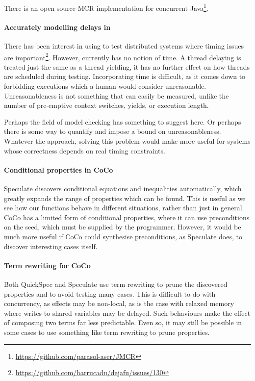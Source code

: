 There is an open source MCR implementation for concurrent
Java\footnote{\url{https://github.com/parasol-aser/JMCR}}.

\paragraph{Accurately modelling delays in \dejafu{}}
There has been interest in using \dejafu{} to test distributed systems
where timing issues are
important\footnote{\url{https://github.com/barrucadu/dejafu/issues/130}}.
However, \dejafu{} currently has no notion of time.  A thread delaying
is treated just the same as a thread yielding, it has no further
effect on how threads are scheduled during testing.  Incorporating
time is difficult, as it comes down to forbidding executions which a
human would consider unreasonable.  Unreasonableness is not something
that can easily be measured, unlike the number of pre-emptive context
switches, yields, or execution length.

Perhaps the field of model checking has something to suggest here.  Or
perhaps there is some way to quantify and impose a bound on
unreasonableness.  Whatever the approach, solving this problem would
make \dejafu{} more useful for systems whose correctness depends on
real timing constraints.

\paragraph{Conditional properties in CoCo}
Speculate\cite{braquehais2017} discovers conditional equations and
inequalities automatically, which greatly expands the range of
properties which can be found.  This is useful as we see how our
functions behave in different situations, rather than just in general.
CoCo has a limited form of conditional properties, where it can use
preconditions on the seed, which must be supplied by the programmer.
However, it would be much more useful if CoCo could synthesise
preconditions, as Speculate does, to discover interesting cases
itself.

\paragraph{Term rewriting for CoCo}
Both QuickSpec\cite{smallbone2017} and Speculate\cite{braquehais2017}
use term rewriting to prune the discovered properties and to avoid
testing many cases.  This is difficult to do with concurrency, as
effects may be non-local, as is the case with relaxed
memory\cite{zhang2015} where writes to shared variables may be
delayed.  Such behaviours make the effect of composing two terms far
less predictable.  Even so, it may still be possible in some cases to
use something like term rewriting to prune properties.
